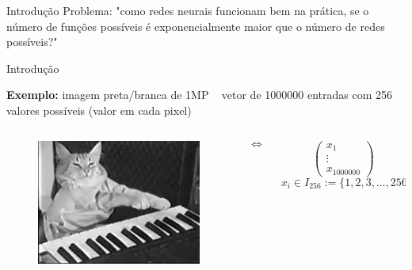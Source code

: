 \documentclass{beamer}
\begin{document}
\begin{frame}{Introdução}
    Problema: "como redes neurais funcionam bem na prática, se o número de funções possíveis é exponencialmente maior que o número de redes possíveis?"

\end{frame}


\begin{frame}{Introdução}

    \textbf{Exemplo:} imagem preta/branca de 1MP ~ vetor de 1000000 entradas com 256 valores possíveis (valor em cada pixel)

    \pause

    \begin{columns}
        \begin{column}{0.3\textwidth}
            \begin{figure}
                \includegraphics[width=\textwidth]{fig/keyboard-cat.png}
            \end{figure}
        \end{column}
        \begin{column}{0.1\textwidth}
            \[
                \iff
            \]
        \end{column}
        \begin{column}{0.3\textwidth}
            \small
            \[
                \begin{pmatrix}
                    x_1 \\
                    \vdots \\
                    x_{1000000}
                \end{pmatrix}
            \]
            \[
            x_i \in I_{256} := \{1,2,3,\dots,256\}
            \]
        \end{column}
    \end{columns}


\end{frame}
\end{document}
